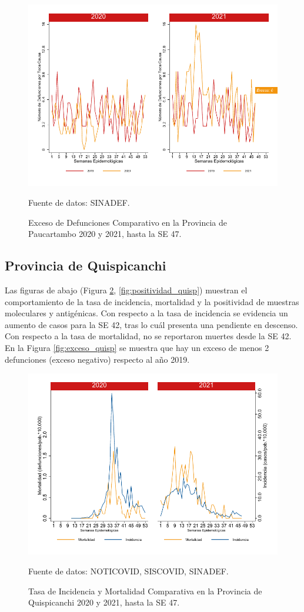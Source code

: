 \documentclass[12pt,a4paper,openany]{book}
\begin{document}
		\begin{figure}[h]
			\caption{Exceso de Defunciones Comparativo en la Provincia de Paucartambo 2020 y 2021, hasta la SE 47.}\label{fig:exceso_paucartam}
			\begin{center}
				\includegraphics[width=0.7\linewidth]{../figuras/exceso_11}
			\end{center}
			{\footnotesize {Fuente de datos: SINADEF.}}
		\end{figure}
		
		\clearpage
		
		\subsection*{Provincia de Quispicanchi}
		\noindent Las figuras de abajo (Figura \ref{fig:inc_mort_quisp}, \ref{fig:positividad_quisp}) muestran el comportamiento de la tasa de incidencia, mortalidad y la positividad de muestras moleculares y antigénicas. Con respecto a la tasa de incidencia se evidencia un aumento de casos para la SE 42, tras lo cuál presenta una pendiente en descenso.  
		Con respecto a la tasa de mortalidad, no se reportaron muertes desde la SE 42.
	En la Figura \ref{fig:exceso_quisp} se muestra que hay un exceso de menos 2 defunciones (exceso negativo) respecto al año 2019.
		
		\begin{figure}[h]
			\caption{Tasa de Incidencia y Mortalidad Comparativa en la Provincia de Quispicanchi 2020 y 2021, hasta la SE 47.}\label{fig:inc_mort_quisp}
			\begin{center}
				\includegraphics[width=0.7\linewidth]{../figuras/incidencia_mortalidad_20_21_12}
			\end{center}
			{\footnotesize {Fuente de datos: NOTICOVID, SISCOVID, SINADEF.}}
		\end{figure}
		
\end{document}
